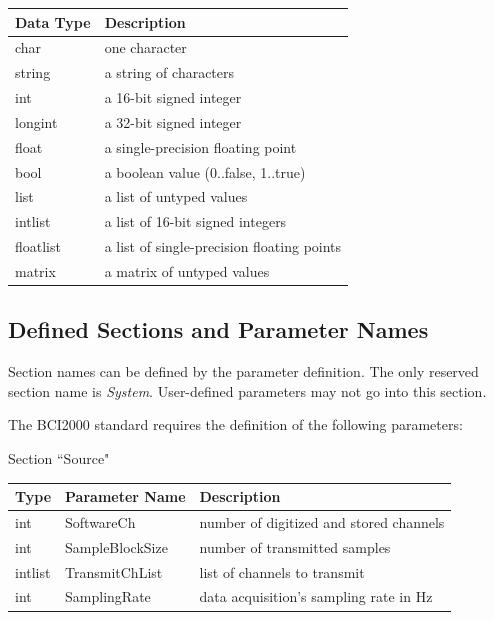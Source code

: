 \documentclass[letterpaper,oneside,12pt]{book}
\begin{document}
\begin{flushleft}

\begin{centering}
 \begin{tabular}{|l|l|}
  \hline
  \textbf{Data Type} & \textbf{Description} \\
  \hline
  char & one character \\
  \hline
  string & a string of characters \\
  \hline
  int & a 16-bit signed integer \\
  \hline
  longint & a 32-bit signed integer \\
  \hline
  float & a single-precision floating point \\
  \hline
  bool & a boolean value (0..false, 1..true) \\
  \hline
  list & a list of untyped values \\
  \hline
  intlist & a list of 16-bit signed integers \\
  \hline
  floatlist & a list of single-precision floating points \\
  \hline
  matrix & a matrix of untyped values \\
  \hline
 \end{tabular}
\end{centering}   

\vspace{.5cm}

\newpage

\subsection{Defined Sections and Parameter Names}

Section names can be defined by the parameter definition. The only reserved 
section name is \emph{System}. User-defined parameters may not go into this 
section.

The BCI2000 standard requires the definition of the following parameters:

\raggedright \large Section ``Source" \normalsize
\\[2ex]
 \begin{tabular}{|l|l|l|}
  \hline
  \textbf{Type} & \textbf{Parameter Name} & \textbf{Description}\\
  \hline
  int & SoftwareCh & number of digitized and stored channels \\
  \hline
  int & SampleBlockSize & number of transmitted samples \\
  \hline
  intlist & TransmitChList & list of channels to transmit \\
  \hline
  int & SamplingRate & data acquisition's sampling rate in Hz \\
  \hline
 \end{tabular}


\end{flushleft}
\end{document}
